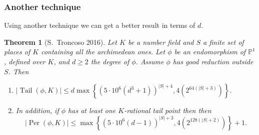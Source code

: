 \documentclass{beamer}
\def\jump{ \quad \\ \vspace{0.7cm} \pause}
\def\PP{{\mathbb P}}
\DeclareMathOperator{\Tail}{Tail}
\DeclareMathOperator{\Per}{Per}
\theoremstyle{thmstyle}
\theoremstyle{thmstyle}
\newtheorem*{mythm}{Theorem}
\theoremstyle{mystyle}
\theoremstyle{qstnstyle}
\begin{document}
%


\begin{frame}
\frametitle{Another technique}

Using another technique we can get a better result in terms of $d$.  

\begin{mythm}[S.\ Troncoso 2016]
Let $K$ be a number field and $S$ a finite set of places of $K$ containing all the archimedean ones. Let $\phi $ be an endomorphism of $\PP^1$, defined over $K$, and $d \geq 2$ the degree of $\phi$. Assume $\phi$ has  good reduction outside $S$. Then

\begin{enumerate}

\item [(a)] $|\Tail(\phi,K) | \leq d\max\left\{  (5 \cdot 10^6 (d^3+1))^{|S|+4} ,4(2^{64(|S|+3)}) \right \}.$

\item [(b)] In addition, if $\phi$ has at least one $K$-rational tail point then then
$$|\Per(\phi,K)| \leq   \max \left\{  (5 \cdot 10^6 (d-1))^{|S|+3} ,4(2^{128(|S|+2)}) \right\}+1.$$
\end{enumerate}
\end{mythm}
\end{frame}


%
%
%
%
%
\end{document}
